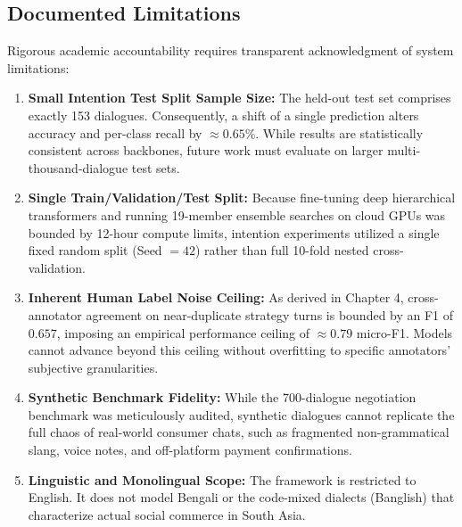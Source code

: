 \subsection{Documented Limitations}
Rigorous academic accountability requires transparent acknowledgment of system limitations:
\begin{enumerate}
  \item \textbf{Small Intention Test Split Sample Size:} The held-out test set comprises exactly 153 dialogues. Consequently, a shift of a single prediction alters accuracy and per-class recall by $\approx 0.65\%$. While results are statistically consistent across backbones, future work must evaluate on larger multi-thousand-dialogue test sets.
  \item \textbf{Single Train/Validation/Test Split:} Because fine-tuning deep hierarchical transformers and running 19-member ensemble searches on cloud GPUs was bounded by 12-hour compute limits, intention experiments utilized a single fixed random split (Seed $= 42$) rather than full 10-fold nested cross-validation.
  \item \textbf{Inherent Human Label Noise Ceiling:} As derived in Chapter 4, cross-annotator agreement on near-duplicate strategy turns is bounded by an F1 of $0.657$, imposing an empirical performance ceiling of $\approx 0.79$ micro-F1. Models cannot advance beyond this ceiling without overfitting to specific annotators' subjective granularities.
  \item \textbf{Synthetic Benchmark Fidelity:} While the 700-dialogue negotiation benchmark was meticulously audited, synthetic dialogues cannot replicate the full chaos of real-world consumer chats, such as fragmented non-grammatical slang, voice notes, and off-platform payment confirmations.
  \item \textbf{Linguistic and Monolingual Scope:} The framework is restricted to English. It does not model Bengali or the code-mixed dialects (Banglish) that characterize actual social commerce in South Asia.
\end{enumerate}

